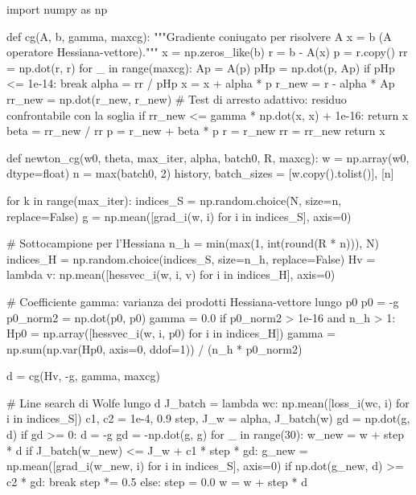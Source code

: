 \begin{pythoncode}[title= Newton-CG]

import numpy as np

def cg(A, b, gamma, maxcg):
    """Gradiente coniugato per risolvere A x = b (A operatore Hessiana-vettore)."""
    x = np.zeros_like(b)
    r = b - A(x)
    p = r.copy()
    rr = np.dot(r, r)
    for _ in range(maxcg):
        Ap = A(p)
        pHp = np.dot(p, Ap)
        if pHp <= 1e-14:
            break
        alpha = rr / pHp
        x = x + alpha * p
        r_new = r - alpha * Ap
        rr_new = np.dot(r_new, r_new)
        # Test di arresto adattivo: residuo confrontabile con la soglia
        if rr_new <= gamma * np.dot(x, x) + 1e-16:
            return x
        beta = rr_new / rr
        p = r_new + beta * p
        r = r_new
        rr = rr_new
    return x

def newton_cg(w0, theta, max_iter, alpha, batch0, R, maxcg):
    w = np.array(w0, dtype=float)
    n = max(batch0, 2)
    history, batch_sizes = [w.copy().tolist()], [n]

    for k in range(max_iter):
        indices_S = np.random.choice(N, size=n, replace=False)
        g = np.mean([grad_i(w, i) for i in indices_S], axis=0)

        # Sottocampione per l'Hessiana
        n_h = min(max(1, int(round(R * n))), N)
        indices_H = np.random.choice(indices_S, size=n_h, replace=False)
        Hv = lambda v: np.mean([hessvec_i(w, i, v) for i in indices_H], axis=0)

        # Coefficiente gamma: varianza dei prodotti Hessiana-vettore lungo p0
        p0 = -g
        p0_norm2 = np.dot(p0, p0)
        gamma = 0.0
        if p0_norm2 > 1e-16 and n_h > 1:
            Hp0 = np.array([hessvec_i(w, i, p0) for i in indices_H])
            gamma = np.sum(np.var(Hp0, axis=0, ddof=1)) / (n_h * p0_norm2)

        d = cg(Hv, -g, gamma, maxcg)

        # Line search di Wolfe lungo d
        J_batch = lambda wc: np.mean([loss_i(wc, i) for i in indices_S])
        c1, c2 = 1e-4, 0.9
        step, J_w = alpha, J_batch(w)
        gd = np.dot(g, d)
        if gd >= 0:
            d = -g
            gd = -np.dot(g, g)
        for _ in range(30):
            w_new = w + step * d
            if J_batch(w_new) <= J_w + c1 * step * gd:
                g_new = np.mean([grad_i(w_new, i) for i in indices_S], axis=0)
                if np.dot(g_new, d) >= c2 * gd:
                    break
            step *= 0.5
        else:
            step = 0.0
        w = w + step * d


\end{pythoncode}
